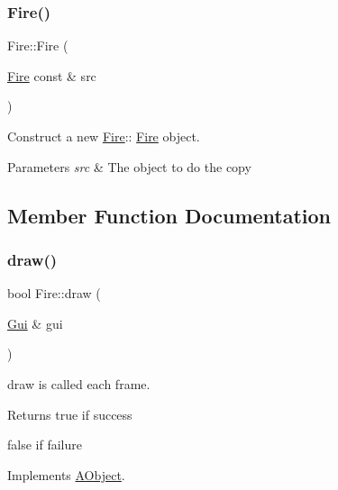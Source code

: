 \subsubsection{\texorpdfstring{Fire()}{Fire()}\hspace{0.1cm}{\footnotesize\ttfamily [2/2]}}
{\footnotesize\ttfamily Fire\+::\+Fire (\begin{DoxyParamCaption}\item[{\hyperlink{class_fire}{Fire} const \&}]{src }\end{DoxyParamCaption})}



Construct a new \hyperlink{class_fire}{Fire}\+:\+: \hyperlink{class_fire}{Fire} object. 


\begin{DoxyParams}{Parameters}
{\em src} & The object to do the copy \\
\hline
\end{DoxyParams}


\subsection{Member Function Documentation}
\mbox{\label{class_fire_a622efdbee6254c463250b6d9033428eb}} 
\subsubsection{\texorpdfstring{draw()}{draw()}}
{\footnotesize\ttfamily bool Fire\+::draw (\begin{DoxyParamCaption}\item[{\hyperlink{class_gui}{Gui} \&}]{gui }\end{DoxyParamCaption})\hspace{0.3cm}{\ttfamily [virtual]}}



draw is called each frame. 

\begin{DoxyReturn}{Returns}
true if success 

false if failure 
\end{DoxyReturn}


Implements \hyperlink{class_a_object_a5e454e13e04ee937c20a465244cf748a}{A\+Object}.

\mbox{\label{class_fire_ae6456b9911e675ed1fb030f5f9e89cc8}} 
